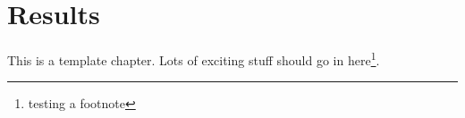 \chapter{Results}
This is a template chapter. Lots of exciting stuff should go in here\footnote{testing a footnote}.


